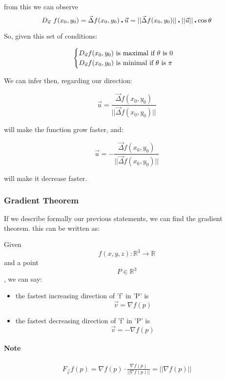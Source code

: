 \documentclass[11pt,fleqn]{book} %
\begin{document}
from this we can observe
\begin{equation}
    D_{\vec{u}}\ f(x_0, y_0) = \vec{\Delta} f(x_0, y_0) \centerdot \vec{u} = ||\vec{\Delta} f(x_0,y_0)|| \centerdot ||\vec{u}|| \centerdot \cos \theta\\
\end{equation}

So, given this set of conditions:

\begin{gather}
    \begin{cases}
        D_{\vec{u}} f(x_0, y_0) \text{  is maximal if $ \theta $ is 0} \\
        D_{\vec{u}} f(x_0, y_0) \text{  is minimal if $ \theta $ is $\pi$}
    \end{cases}
\end{gather}

We can infer then, regarding our direction:

\begin{equation}
    \vec{u} = \frac{\vec{\Delta} f(x_0, y_0)}{||\vec{\Delta}f(x_0,y_0)||}
\end{equation}

will make the function grow faster, and:

\begin{equation}
    \vec{u} = - \frac{\vec{\Delta} f(x_0, y_0)}{||\vec{\Delta}f(x_0,y_0)||}
\end{equation}

will make it decrease faster.

\subsubsection{Gradient Theorem}

If we describe formally our previous statements, we can find the gradient theorem.
this can be written as:

Given $$f(x,y,z): \mathbb{R}^3 \to \mathbb{{R}}$$
and a point $$P \in \mathbb{R}^3$$, we can say:

\begin{itemize}
    \item the fastest increasing direction of 'f' in 'P' is $$\vec{v} = \nabla f(p)$$
    \item the fastest decreasing direction of 'f' in 'P' is $$\vec{v} = - \nabla f(p)$$
\end{itemize}

\paragraph{Note}
\begin{gather}
    F_{\vec{v}} f(p) = \nabla f(p) \cdot \frac{\nabla f(p)}{||\nabla f(p)||} = ||\nabla f(p)||
\end{gather}
\end{document}
